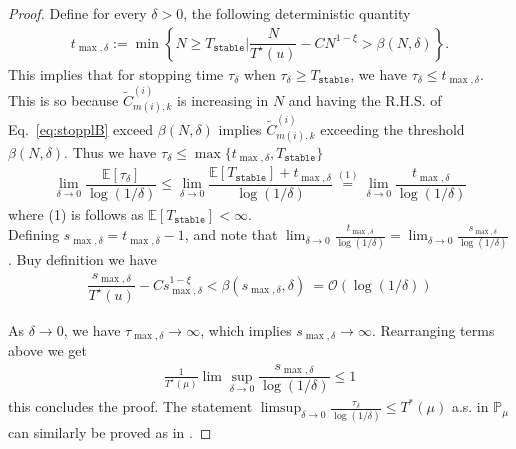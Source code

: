 \documentclass{article}
\newcommand{\stable}{\texttt{stable}}
\newcommand{\E}{\mathbb{E}}
\begin{document}
\begin{proof}
    Define for every $\delta>0$, the following deterministic quantity
    \begin{align*}
        t_{\max,\delta}:= \min\left\{N\geq T_{\texttt{stable}}\Big| \dfrac{N}{T^{\star}(u)}-CN^{1-\xi}>\beta(N,\delta)\right\}. 
    \end{align*}
    This implies that for stopping time $\tau_{\delta}$ when $\tau_{\delta}\geq T_{\texttt{stable}}$, we have $\tau_{\delta}\leq t_{\max,\delta}$. This is so because $ \tilde{C}^{(i)}_{m(i),k}$ is increasing in $N$ and having the R.H.S. of Eq.~\ref{eq:stopplB} exceed $\beta(N,\delta)$ implies $ \tilde{C}^{(i)}_{m(i),k}$ exceeding the threshold $\beta(N,\delta)$. Thus we have $\tau_{\delta}\leq \max\{ t_{\max,\delta},T_{\stable}\}$\\ 
    \begin{align*}
        \lim_{\delta\to 0}\dfrac{\E[\tau_{\delta}]}{\log(1/\delta)}\leq  \lim_{\delta\to 0}\dfrac{\E[T_{\stable}]+ t_{\max,\delta}}{\log(1/\delta)}\overset{(1)}{=} \lim_{\delta\to 0}\dfrac{ t_{\max,\delta}}{\log(1/\delta)}
    \end{align*}
    where (1) is follows as $\E[T_{\stable}]< \infty$.\\
    Defining $s_{\max,\delta}=t_{\max,\delta}-1$, and note that $\lim_{\delta\to 0}\frac{t_{\max,\delta}}{\log(1/\delta)}=\lim_{\delta\to 0}\frac{s_{\max,\delta}}{\log(1/\delta)}$. Buy definition we have
    \begin{align*}
        \dfrac{s_{\max,\delta}}{T^{\star}(u)}-Cs_{\max,\delta}^{1-\xi}<\beta(s_{\max,\delta},\delta)\ = \mathcal{O}(\log(1/\delta)) 
    \end{align*}

    As $\delta\to 0$, we have $\tau_{\max,\delta}\to\infty$, which implies $s_{\max,\delta}\to \infty$. Rearranging terms above we get
    \begin{align*}
        \frac{1}{T^{\star}(\mu)}\lim\sup_{\delta\to 0 }\dfrac{s_{\max,\delta}}{\log(1/\delta)}\leq 1
    \end{align*}
    this concludes the proof. The statement $\limsup_{\delta\to 0}\frac{\tau_{\delta}}{\log(1/\delta)}\leq T^*(\mu)$ a.s. in $\mathbb{P}_\mu$ can similarly be proved as in \cite[Appendix H.]{bandyopadhyay2024optimal}.
\end{proof}
\end{document}
